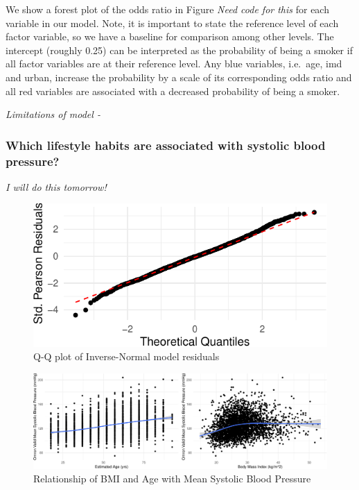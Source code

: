 \documentclass[
  11pt,
]{article}
\begin{document}
We show a forest plot of the odds ratio in Figure \emph{Need code for
this} for each variable in our model. Note, it is important to state the
reference level of each factor variable, so we have a baseline for
comparison among other levels. The intercept (roughly 0.25) can be
interpreted as the probability of being a smoker if all factor variables
are at their reference level. Any blue variables, i.e.~age, imd and
urban, increase the probability by a scale of its corresponding odds
ratio and all red variables are associated with a decreased probability
of being a smoker.

\emph{Limitations of model -}

\subsubsection{Which lifestyle habits are associated with systolic blood
pressure?}\label{which-lifestyle-habits-are-associated-with-systolic-blood-pressure}

\emph{I will do this tomorrow!}

\begin{figure}[H]

{\centering \includegraphics{Coursework_files/figure-latex/output qq plot for q3-1} 

}

\caption{Q-Q plot of Inverse-Normal model residuals}\label{fig:output qq plot for q3}
\end{figure}

\begin{figure}[H]
\includegraphics{Coursework_files/figure-latex/output relationship plots-1} \caption{Relationship of BMI and Age with Mean Systolic Blood Pressure}\label{fig:output relationship plots}
\end{figure}
\end{document}
